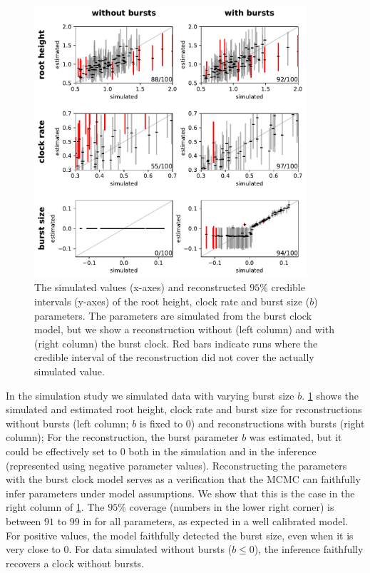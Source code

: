 \documentclass[]{rsos}%
\begin{document}
\begin{figure}
    \centering
    \includegraphics[width=0.9\textwidth]{supplement/simulation_study/coverage.pdf}
    \caption{The simulated values (x-axes) and reconstructed $95\%$ credible intervals (y-axes) of the root height, clock rate and burst size ($b$) parameters. The parameters are simulated from the burst clock model, but we show a reconstruction without (left column) and with (right column) the burst clock. Red bars indicate runs where the credible interval of the reconstruction did not cover the actually simulated value.}
    \label{f:simulation}
\end{figure}

In the simulation study we simulated data with varying burst size $b$. \cref{f:simulation} shows the simulated and estimated root height, clock rate and burst size for reconstructions without bursts (left column; $b$ is fixed to $0$) and reconstructions with bursts (right column); For the reconstruction, the burst parameter $b$ was estimated, but it could be effectively set to $0$ both in the simulation and in the inference (represented using negative parameter values).
Reconstructing the parameters with the burst clock model serves as a
verification that the MCMC can faithfully infer parameters under model
assumptions. We show that this is the case in the right column of \cref{f:simulation}. The $95\%$ coverage (numbers in the lower right corner) is between  $91$ to $99$ in for all parameters, as expected in a well calibrated model. For positive values, the model faithfully detected the burst size, even when it is very close to $0$.
For data simulated without bursts ($b\leq 0$), the inference faithfully recovers
a clock without bursts.
\end{document}
